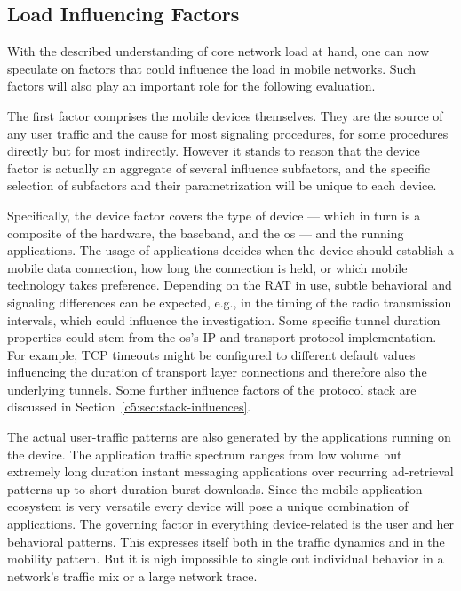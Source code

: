 \subsection{Load Influencing Factors}

With the described understanding of core network load at hand, one can now speculate on factors that could influence the load in mobile networks. Such factors will also play an important role for the following evaluation.

The first 
factor comprises the mobile devices themselves. They are the source of any user traffic and the cause for most signaling procedures, for some procedures directly but for most indirectly. However it stands to reason that the device factor is actually an aggregate of several influence subfactors, and the specific selection of subfactors and their parametrization will be unique to each device.

Specifically, the device factor covers the type of device --- which in turn is a composite of the hardware, the baseband, and the \gls{os} --- and the running applications. The usage of applications decides when the device should establish a mobile data connection, how long the connection is held, or which mobile technology takes preference. Depending on the \gls{RAT} in use, subtle behavioral and signaling differences can be expected, e.g., in the timing of the radio transmission intervals, which could influence the investigation. Some specific 
tunnel duration properties could stem from the \gls{os}'s \gls{IP} and transport protocol implementation. For example, \gls{TCP} timeouts might be configured to different default values influencing the duration of transport layer connections and therefore also the underlying tunnels. Some further influence factors of the protocol stack are discussed in Section~\ref{c5:sec:stack-influences}.

The actual user-traffic patterns are also generated by the applications running on the device. The application traffic spectrum ranges from low volume but extremely long duration instant messaging applications over recurring ad-retrieval patterns up to short duration burst downloads. Since the mobile application ecosystem is very versatile every device will pose a unique combination of applications. The governing factor in everything device-related is the user and her behavioral patterns. This expresses itself both in the traffic dynamics and in the mobility pattern. But it is nigh impossible to single out individual behavior in a network's traffic mix or a large network trace.

